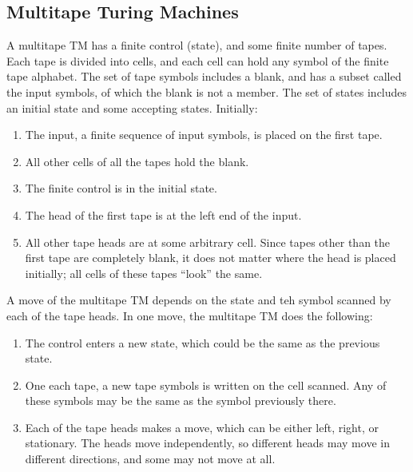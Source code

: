 \documentclass[]{article}
\begin{document}
  \subsection*{Multitape Turing Machines}
    A multitape TM has a finite control (state), and some finite number of tapes. 
    Each tape is divided into cells, and each cell can hold any symbol of the 
    finite tape alphabet. The set of tape symbols includes a blank, and has a 
    subset called the input symbols, of which the blank is not a member. The set 
    of states includes an initial state and some accepting states. Initially:
      \begin{enumerate}
        \item The input, a finite sequence of input symbols, is placed on the 
        first tape.
        \item All other cells of all the tapes hold the blank.
        \item The finite control is in the initial state.
        \item The head of the first tape is at the left end of the input.
        \item All other tape heads are at some arbitrary cell. Since tapes other 
        than the first tape are completely blank, it does not matter where the 
        head is placed initially; all cells of these tapes ``look'' the same.
      \end{enumerate}
    A move of the multitape TM depends on the state and teh symbol scanned by each 
    of the tape heads. In one move, the multitape TM does the following:
      \begin{enumerate}
        \item The control enters a new state, which could be the same as the 
        previous state.
        \item One each tape, a new tape symbols is written on the cell scanned. 
        Any of these symbols may be the same as the symbol previously there.
        \item Each of the tape heads makes a move, which can be either left, 
        right, or stationary. The heads move independently, so different heads may 
        move in different directions, and some may not move at all.
      \end{enumerate}
  
\end{document}

